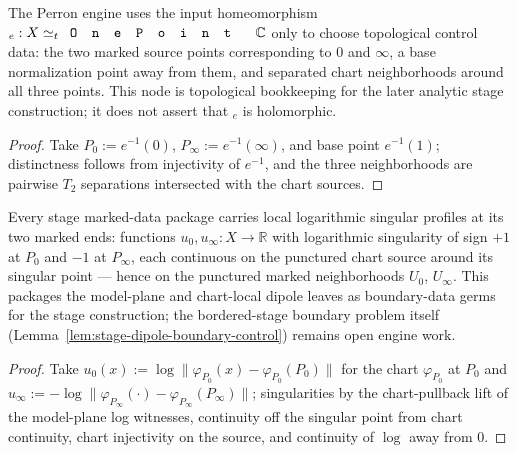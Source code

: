 \begin{lemma}
\label{lem:stage-marked-topological-control-data}
The Perron engine uses the input homeomorphism
\(_e : X \simeq_t \code{OnePoint}\,\C\) only to choose topological control
data: the two marked source points corresponding to \(0\) and \(\infty\), a
base normalization point away from them, and separated chart neighborhoods
around all three points.  This node is topological bookkeeping for the later
analytic stage construction; it does not assert that \(_e\) is holomorphic.
\leanok
\end{lemma}
\begin{proof}\leanok
Take \(P_0 := e^{-1}(0)\), \(P_\infty := e^{-1}(\infty)\), and base point
\(e^{-1}(1)\); distinctness follows from injectivity of \(e^{-1}\), and the
three neighborhoods are pairwise \(T_2\) separations intersected with the
chart sources.
\end{proof}

\begin{lemma}
\label{lem:stage-dipole-local-singular-profiles}
Every stage marked-data package carries local logarithmic singular profiles
at its two marked ends: functions \(u_0, u_\infty : X \to \mathbb{R}\) with
logarithmic singularity of sign \(+1\) at \(P_0\) and \(-1\) at
\(P_\infty\), each continuous on the punctured chart source around its
singular point — hence on the punctured marked neighborhoods \(U_0\),
\(U_\infty\).  This packages the model-plane and chart-local dipole leaves
as boundary-data germs for the stage construction; the bordered-stage
boundary problem itself (Lemma~\ref{lem:stage-dipole-boundary-control})
remains open engine work.
\leanok
\end{lemma}
\begin{proof}\leanok
Take \(u_0(x) := \log\lVert\varphi_{P_0}(x) - \varphi_{P_0}(P_0)\rVert\) for
the chart \(\varphi_{P_0}\) at \(P_0\) and
\(u_\infty := -\log\lVert\varphi_{P_\infty}(\cdot) -
\varphi_{P_\infty}(P_\infty)\rVert\); singularities by the chart-pullback
lift of the model-plane log witnesses, continuity off the singular point
from chart continuity, chart injectivity on the source, and continuity of
\(\log\) away from \(0\).
\end{proof}

